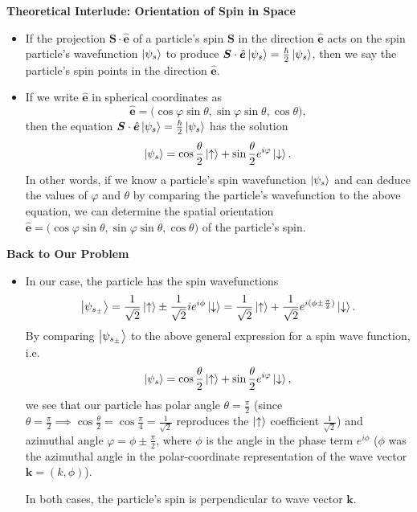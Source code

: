 \documentclass[11pt, a4paper]{article}
\renewcommand{\vec}[1]{\bm{#1}} %
\newcommand{\uvec}[1]{\hat{\vec{#1}}} %
\newcommand{\ua}{\uparrow}  %
\newcommand{\da}{\downarrow}  %
\renewcommand{\k}{\vec{k}}  %
\begin{document}
\textbf{Theoretical Interlude: Orientation of Spin in Space}
\begin{itemize}
	\item If the projection $ \vec{S} \cdot \uvec{e}$ of a particle's spin $ \vec{S} $ in the direction $ \uvec{e} $ acts on the spin particle's wavefunction $ \ket{\psi_{s}} $ to produce $  \vec{S} \cdot \uvec{e} \ket{\psi_{s}} = \frac{\hbar}{2}\ket{\psi_{s}} $, then we say the particle's spin points in the direction $ \uvec{e} $. 
	
	\item If we write $ \uvec{e} $ in spherical coordinates as 
	\begin{equation*}
		\uvec{e} = \big(\cos \varphi \sin \theta, \sin \varphi \sin \theta, \cos \theta\big),
	\end{equation*}
	then the equation $  \vec{S} \cdot \uvec{e} \ket{\psi_{s}} = \frac{\hbar}{2}\ket{\psi_{s}} $ has the solution 
	\begin{equation*}
		\ket{\psi_{s}} = \cos \frac{\theta}{2} \ket{\ua} + \sin \frac{\theta}{2} e^{i\varphi} \ket{\da}.
	\end{equation*}
	In other words, if we know a particle's spin wavefunction $ \ket{\psi_{s}} $ and can deduce the values of $ \varphi $ and $ \theta $ by comparing the particle's wavefunction to the above equation, we can determine the spatial orientation $ \uvec{e} = \big(\cos \varphi \sin \theta, \sin \varphi \sin \theta, \cos \theta\big) $  of the particle's spin.
	
\end{itemize}

\textbf{Back to Our Problem}
\begin{itemize}
	\item In our case, the particle has the spin wavefunctions
	\begin{equation*}
		\ket{\psi_{s_{\pm}}} = \frac{1}{\sqrt{2}}\ket{\ua} \pm \frac{1}{\sqrt{2}} ie^{i\phi}\ket{\da} =  \frac{1}{\sqrt{2}}\ket{\ua} + \frac{1}{\sqrt{2}} e^{i(\phi \pm \frac{\pi}{2})}\ket{\da}.
	\end{equation*} 
	By comparing $ \ket{\psi_{s_{\pm}}} $ to the above general expression for a spin wave function, i.e.
	\begin{equation*}
		 \ket{\psi_{s}} = \cos \frac{\theta}{2} \ket{\ua} + \sin \frac{\theta}{2} e^{i\varphi} \ket{\da},
	\end{equation*}
	we see that our particle has polar angle $ \theta = \frac{\pi}{2} $ (since $ \theta = \frac{\pi}{2} \implies \cos \frac{\theta}{2} = \cos \frac{\pi}{4} = \frac{1}{\sqrt{2}} $ reproduces the $ \ket{\ua} $ coefficient $ \frac{1}{\sqrt{2}} $) and azimuthal angle $ \varphi = \phi \pm \frac{\pi}{2} $, where $ \phi $ is the angle in the phase term $ e^{i\phi} $ ($ \phi $ was the azimuthal angle in the polar-coordinate representation of the wave vector $ \k = (k, \phi) $). 
	
	In both cases, the particle's spin is perpendicular to wave vector $ \vec{k} $. 
\end{itemize}
\end{document}
